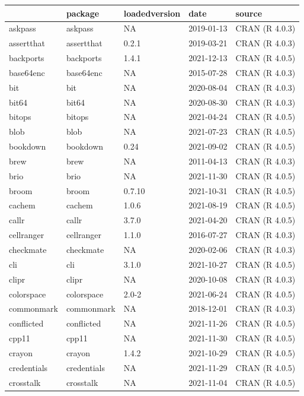 \begin{tabular}{lllll}
\toprule
  & package & loadedversion & date & source\\
\midrule
askpass & askpass & NA & 2019-01-13 & CRAN (R 4.0.3)\\
assertthat & assertthat & 0.2.1 & 2019-03-21 & CRAN (R 4.0.3)\\
backports & backports & 1.4.1 & 2021-12-13 & CRAN (R 4.0.5)\\
base64enc & base64enc & NA & 2015-07-28 & CRAN (R 4.0.3)\\
bit & bit & NA & 2020-08-04 & CRAN (R 4.0.3)\\
\addlinespace
bit64 & bit64 & NA & 2020-08-30 & CRAN (R 4.0.3)\\
bitops & bitops & NA & 2021-04-24 & CRAN (R 4.0.5)\\
blob & blob & NA & 2021-07-23 & CRAN (R 4.0.5)\\
bookdown & bookdown & 0.24 & 2021-09-02 & CRAN (R 4.0.5)\\
brew & brew & NA & 2011-04-13 & CRAN (R 4.0.3)\\
\addlinespace
brio & brio & NA & 2021-11-30 & CRAN (R 4.0.5)\\
broom & broom & 0.7.10 & 2021-10-31 & CRAN (R 4.0.5)\\
cachem & cachem & 1.0.6 & 2021-08-19 & CRAN (R 4.0.5)\\
callr & callr & 3.7.0 & 2021-04-20 & CRAN (R 4.0.5)\\
cellranger & cellranger & 1.1.0 & 2016-07-27 & CRAN (R 4.0.3)\\
\addlinespace
checkmate & checkmate & NA & 2020-02-06 & CRAN (R 4.0.3)\\
cli & cli & 3.1.0 & 2021-10-27 & CRAN (R 4.0.5)\\
clipr & clipr & NA & 2020-10-08 & CRAN (R 4.0.3)\\
colorspace & colorspace & 2.0-2 & 2021-06-24 & CRAN (R 4.0.5)\\
commonmark & commonmark & NA & 2018-12-01 & CRAN (R 4.0.3)\\
\addlinespace
conflicted & conflicted & NA & 2021-11-26 & CRAN (R 4.0.5)\\
cpp11 & cpp11 & NA & 2021-11-30 & CRAN (R 4.0.5)\\
crayon & crayon & 1.4.2 & 2021-10-29 & CRAN (R 4.0.5)\\
credentials & credentials & NA & 2021-11-29 & CRAN (R 4.0.5)\\
crosstalk & crosstalk & NA & 2021-11-04 & CRAN (R 4.0.5)\\

\end{tabular}
